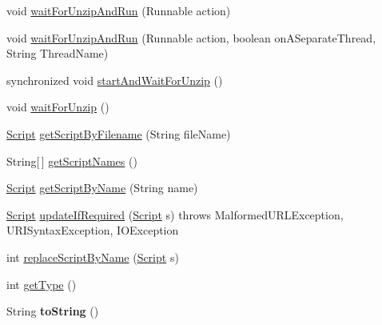 \begin{DoxyCompactItemize}
\item 
void \hyperlink{class_c_a_s_u_a_l_1_1caspac_1_1_caspac_a25eab75bfce4a2bae8fdba570cfd6058}{wait\-For\-Unzip\-And\-Run} (Runnable action)
\item 
void \hyperlink{class_c_a_s_u_a_l_1_1caspac_1_1_caspac_ab4b478740128dbaa88b98c90355e5281}{wait\-For\-Unzip\-And\-Run} (Runnable action, boolean on\-A\-Separate\-Thread, String Thread\-Name)
\item 
synchronized void \hyperlink{class_c_a_s_u_a_l_1_1caspac_1_1_caspac_a22043ae423610f6606aaacc96fff6e17}{start\-And\-Wait\-For\-Unzip} ()
\item 
void \hyperlink{class_c_a_s_u_a_l_1_1caspac_1_1_caspac_aa65ea1d52f47d7c8677d61be754e4d58}{wait\-For\-Unzip} ()
\item 
\hyperlink{class_c_a_s_u_a_l_1_1caspac_1_1_script}{Script} \hyperlink{class_c_a_s_u_a_l_1_1caspac_1_1_caspac_aaba95454fe20cc7b6c600f3a631866a6}{get\-Script\-By\-Filename} (String file\-Name)
\item 
String\mbox{[}$\,$\mbox{]} \hyperlink{class_c_a_s_u_a_l_1_1caspac_1_1_caspac_a7faa66edaa415d62849653e520dce639}{get\-Script\-Names} ()
\item 
\hyperlink{class_c_a_s_u_a_l_1_1caspac_1_1_script}{Script} \hyperlink{class_c_a_s_u_a_l_1_1caspac_1_1_caspac_ace15ecf5d9e7e261161df7ea440d5cc5}{get\-Script\-By\-Name} (String name)
\item 
\hyperlink{class_c_a_s_u_a_l_1_1caspac_1_1_script}{Script} \hyperlink{class_c_a_s_u_a_l_1_1caspac_1_1_caspac_aef18425c5e00d5e2b3c4df0203a65e13}{update\-If\-Required} (\hyperlink{class_c_a_s_u_a_l_1_1caspac_1_1_script}{Script} s)  throws Malformed\-U\-R\-L\-Exception, U\-R\-I\-Syntax\-Exception, I\-O\-Exception 
\item 
int \hyperlink{class_c_a_s_u_a_l_1_1caspac_1_1_caspac_a8d0624f21da3574c9c7b56d8be8528f9}{replace\-Script\-By\-Name} (\hyperlink{class_c_a_s_u_a_l_1_1caspac_1_1_script}{Script} s)
\item 
int \hyperlink{class_c_a_s_u_a_l_1_1caspac_1_1_caspac_a77677db3452946270ba592fad11ed1d1}{get\-Type} ()
\item 
\hypertarget{class_c_a_s_u_a_l_1_1caspac_1_1_caspac_a2f5a390c0f4f4e777fa5e2103bb8effa}{String {\bfseries to\-String} ()}\label{class_c_a_s_u_a_l_1_1caspac_1_1_caspac_a2f5a390c0f4f4e777fa5e2103bb8effa}


\end{DoxyCompactItemize}
